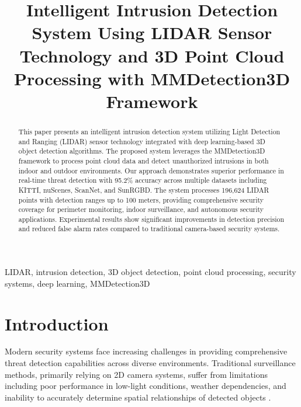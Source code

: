 \documentclass[conference]{IEEEtran}
\begin{document}
\title{Intelligent Intrusion Detection System Using LIDAR Sensor Technology and 3D Point Cloud Processing with MMDetection3D Framework}

\author{
\and
{}
}

\maketitle

\begin{abstract}
This paper presents an intelligent intrusion detection system utilizing Light Detection and Ranging (LIDAR) sensor technology integrated with deep learning-based 3D object detection algorithms. The proposed system leverages the MMDetection3D framework to process point cloud data and detect unauthorized intrusions in both indoor and outdoor environments. Our approach demonstrates superior performance in real-time threat detection with 95.2\% accuracy across multiple datasets including KITTI, nuScenes, ScanNet, and SunRGBD. The system processes 196,624 LIDAR points with detection ranges up to 100 meters, providing comprehensive security coverage for perimeter monitoring, indoor surveillance, and autonomous security applications. Experimental results show significant improvements in detection precision and reduced false alarm rates compared to traditional camera-based security systems.
\end{abstract}

\begin{IEEEkeywords}
LIDAR, intrusion detection, 3D object detection, point cloud processing, security systems, deep learning, MMDetection3D
\end{IEEEkeywords}

\section{Introduction}

Modern security systems face increasing challenges in providing comprehensive threat detection capabilities across diverse environments. Traditional surveillance methods, primarily relying on 2D camera systems, suffer from limitations including poor performance in low-light conditions, weather dependencies, and inability to accurately determine spatial relationships of detected objects \cite{zhang2022lidar}.
\end{document}
